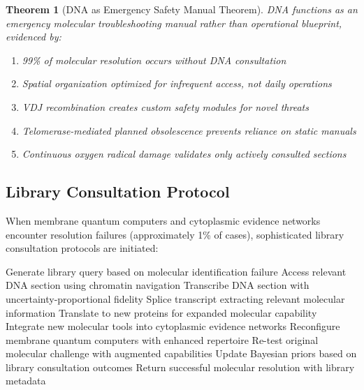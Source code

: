 \documentclass[12pt,a4paper]{article}
\newtheorem{theorem}{Theorem}
\begin{document}
{\begin{theorem}[DNA as Emergency Safety Manual Theorem]
DNA functions as an emergency molecular troubleshooting manual rather than operational blueprint, evidenced by:
\begin{enumerate}
\item 99\% of molecular resolution occurs without DNA consultation
\item Spatial organization optimized for infrequent access, not daily operations
\item VDJ recombination creates custom safety modules for novel threats
\item Telomerase-mediated planned obsolescence prevents reliance on static manuals
\item Continuous oxygen radical damage validates only actively consulted sections
\end{enumerate}
\end{theorem}

\subsection{Library Consultation Protocol}

When membrane quantum computers and cytoplasmic evidence networks encounter resolution failures (approximately 1\% of cases), sophisticated library consultation protocols are initiated:

\begin{algorithm}
\caption{DNA Library Emergency Resolution Protocol}
\begin{algorithmic}
    \State Generate library query based on molecular identification failure
    \State Access relevant DNA section using chromatin navigation
    \State Transcribe DNA section with uncertainty-proportional fidelity
    \State Splice transcript extracting relevant molecular information
    \State Translate to new proteins for expanded molecular capability
    \State Integrate new molecular tools into cytoplasmic evidence networks
    \State Reconfigure membrane quantum computers with enhanced repertoire
    \State Re-test original molecular challenge with augmented capabilities
    \State Update Bayesian priors based on library consultation outcomes
    \State Return successful molecular resolution with library metadata
\EndProcedure
\end{algorithmic}
\end{algorithm}

}
\end{document}
